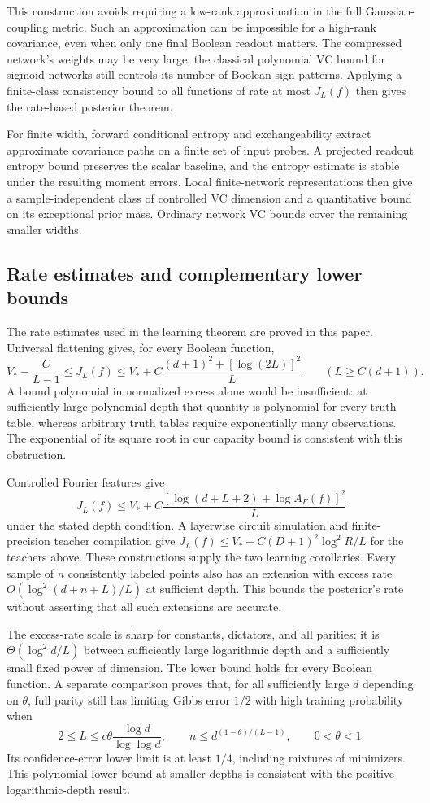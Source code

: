 \documentclass[11pt]{article}
\begin{document}
This construction avoids requiring a low-rank approximation in the
full Gaussian-coupling metric. Such an approximation can be impossible
for a high-rank covariance, even when only one final Boolean readout
matters. The compressed network's weights may be very large; the
classical polynomial VC bound for sigmoid networks still controls
its number of Boolean sign patterns. Applying a finite-class
consistency bound to all functions of rate at most $J_L(f)$ then
gives the rate-based posterior theorem.

For finite width, forward conditional entropy and exchangeability
extract approximate covariance paths on a finite set of input probes.
A projected readout entropy bound preserves the scalar baseline, and
the entropy estimate is stable under the resulting moment errors.
Local finite-network representations then give a sample-independent
class of controlled VC dimension and a quantitative bound on its
exceptional prior mass. Ordinary network VC bounds cover the remaining
smaller widths.

\subsection{Rate estimates and complementary lower bounds}

The rate estimates used in the learning theorem are proved in this
paper. Universal flattening gives, for every Boolean function,
\[
 V_*-\frac C{L-1}\le J_L(f)\le
 V_*+C\frac{(d+1)^2+[\log(2L)]^2}{L}
 \qquad(L\ge C(d+1)).
\]
A bound polynomial in normalized excess alone would be insufficient:
at sufficiently large polynomial depth that quantity is polynomial
for every truth table, whereas arbitrary truth tables require
exponentially many observations. The exponential of its square root
in our capacity bound is consistent with this obstruction.

Controlled Fourier features give
\[
 J_L(f)\le V_*+
 C\frac{[\log(d+L+2)+\log A_F(f)]^2}{L}
\]
under the stated depth condition. A layerwise circuit simulation and
finite-precision teacher compilation give
$J_L(f)\le V_*+C(D+1)^2\log^2R/L$ for the teachers above.
These constructions supply the two learning corollaries.
Every sample of $n$ consistently labeled points also has an
extension with excess rate $O(\log^2(d+n+L)/L)$ at sufficient depth.
This bounds the posterior's rate without asserting that all such
extensions are accurate.

The excess-rate scale is sharp for constants, dictators, and all
parities: it is $\Theta(\log^2d/L)$ between sufficiently large
logarithmic depth and a sufficiently small fixed power of dimension.
The lower bound holds for every Boolean function. A separate
comparison proves that, for all sufficiently large $d$ depending on
$\theta$, full parity still has limiting Gibbs error $1/2$ with high
training probability when
\[
 2\le L\le c\theta\frac{\log d}{\log\log d},
 \qquad n\le d^{(1-\theta)/(L-1)},\qquad 0<\theta<1.
\]
Its confidence-error lower limit is at least $1/4$, including
mixtures of minimizers. This polynomial lower bound at smaller
depths is consistent with the positive logarithmic-depth result.
\end{document}
